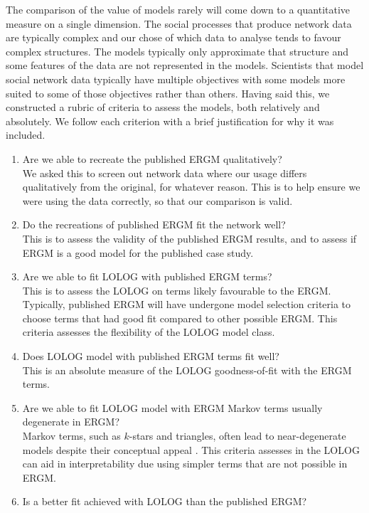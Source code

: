 \documentclass[
]{statsoc}
\begin{document}
The comparison of the value of models rarely will come down to a
quantitative measure on a single dimension. The social processes that
produce network data are typically complex and our chose of which data
to analyse tends to favour complex structures. The models typically only
approximate that structure and some features of the data are not
represented in the models. Scientists that model social network data
typically have multiple objectives with some models more suited to some
of those objectives rather than others. Having said this, we constructed
a rubric of criteria to assess the models, both relatively and
absolutely. We follow each criterion with a brief justification for why
it was included.

\begin{enumerate}
\item Are we able to recreate the published ERGM qualitatively?\\
We asked this to screen out network data where our usage differs qualitatively from the original, for whatever reason. This is to help ensure we were using the data correctly, so that our comparison is valid.
\item Do the recreations of published ERGM fit the network well?\\
This is to assess the validity of the published ERGM results, and to assess if ERGM is a good model for the published case study.
\item Are we able to fit LOLOG with published ERGM terms?\\
This is to assess the LOLOG on terms likely favourable to the ERGM. Typically, published ERGM will have undergone model selection criteria to
choose terms that had good fit compared to other possible ERGM. This criteria assesses the flexibility of the LOLOG model class.
\item Does LOLOG model with published ERGM terms fit well?\\
This is an absolute measure of the LOLOG goodness-of-fit with the ERGM terms.
\item Are we able to fit LOLOG model with ERGM Markov terms usually degenerate in ERGM?\\
Markov terms, such as $k$-stars and triangles, often lead to near-degenerate models despite their conceptual appeal \citep{FrankStrauss1986}. This criteria assesses in the LOLOG can aid in interpretability due using simpler terms that are not possible in ERGM.
\item Is a better fit achieved with LOLOG than the published ERGM?\\

\end{enumerate}
\end{document}
